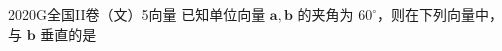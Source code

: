 
\begin{problem}{2020}{G}{全国II卷（文）}{5}{向量}
已知单位向量 $ \boldsymbol{a},\boldsymbol{b} $ 的夹角为 $ 60^\circ $，则在下列向量中，与 $ \boldsymbol{b} $ 垂直的是
\begin{choices}
\end{choices}
\end{problem}

\begin{answer}

\end{answer}

\begin{solutions}

\end{solutions}